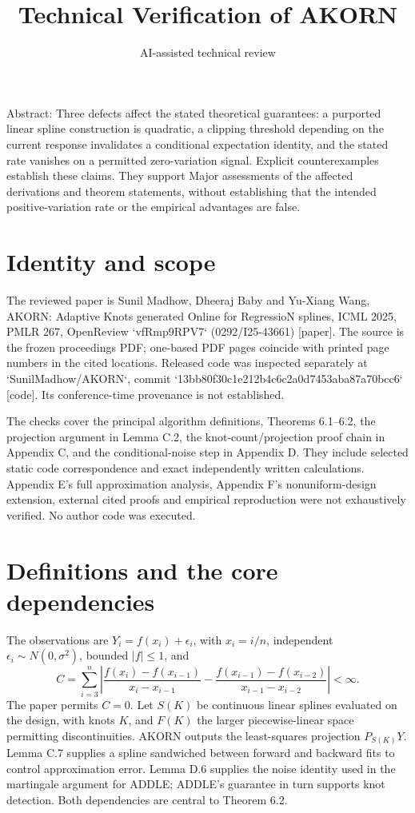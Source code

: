\documentclass[10pt]{article}
\title{Technical Verification of AKORN}
\author{AI-assisted technical review}
\date{}
\begin{document}
\maketitle
Abstract: Three defects affect the stated theoretical guarantees: a purported linear spline construction is quadratic, a clipping threshold depending on the current response invalidates a conditional expectation identity, and the stated rate vanishes on a permitted zero-variation signal. Explicit counterexamples establish these claims. They support Major assessments of the affected derivations and theorem statements, without establishing that the intended positive-variation rate or the empirical advantages are false.\par
\section*{Identity and scope}
The reviewed paper is Sunil Madhow, Dheeraj Baby and Yu-Xiang Wang, AKORN: Adaptive Knots generated Online for RegressioN splines, ICML 2025, PMLR 267, OpenReview `vfRmp9RPV7` (0292/I25-43661) [paper]. The source is the frozen proceedings PDF; one-based PDF pages coincide with printed page numbers in the cited locations. Released code was inspected separately at `SunilMadhow/AKORN`, commit `13bb80f30c1e212b4c6c2a0d7453aba87a70bcc6` [code]. Its conference-time provenance is not established.\par
The checks cover the principal algorithm definitions, Theorems 6.1–6.2, the projection argument in Lemma C.2, the knot-count/projection proof chain in Appendix C, and the conditional-noise step in Appendix D. They include selected static code correspondence and exact independently written calculations. Appendix E’s full approximation analysis, Appendix F’s nonuniform-design extension, external cited proofs and empirical reproduction were not exhaustively verified. No author code was executed.\par
\section*{Definitions and the core dependencies}
The observations are \(Y_i=f(x_i)+\epsilon_i\), with \(x_i=i/n\), independent \(\epsilon_i\sim N(0,\sigma^2)\), bounded \(|f|\le1\), and \[C=\sum_{i=3}^n\left|
 \frac{f(x_i)-f(x_{i-1})}{x_i-x_{i-1}}-
 \frac{f(x_{i-1})-f(x_{i-2})}{x_{i-1}-x_{i-2}}\right|<\infty .\] The paper permits \(C=0\). Let \(S(K)\) be continuous linear splines evaluated on the design, with knots \(K\), and \(F(K)\) the larger piecewise-linear space permitting discontinuities. AKORN outputs the least-squares projection \(P_{S(K)}Y\). Lemma C.7 supplies a spline sandwiched between forward and backward fits to control approximation error. Lemma D.6 supplies the noise identity used in the martingale argument for ADDLE; ADDLE’s guarantee in turn supports knot detection. Both dependencies are central to Theorem 6.2.\par
\end{document}
